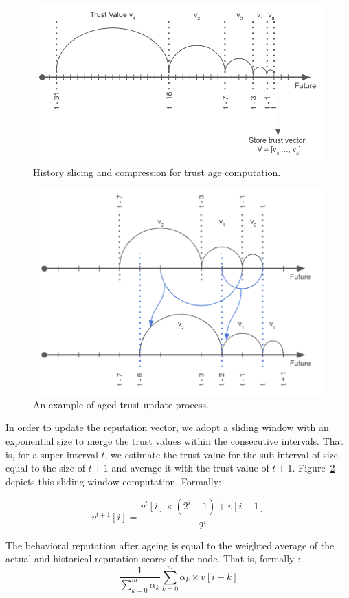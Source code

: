 \documentclass[]{article}
\begin{document}
\begin{figure}[h]
\centering
	\includegraphics[width=0.65\linewidth, trim= 0cm 0cm 0cm 0cm, clip]{Figures/ageB.png}
	\caption{History slicing and compression for trust age computation.}
	\label{fig:historyComp}
\end{figure}

\begin{figure}[h]
\centering
	\includegraphics[width=0.65\linewidth, trim= 0cm 0cm 0cm 0cm, clip]{Figures/ageB1.png}
	\caption{An example of aged trust update process.}
	\label{fig:historyCompUp}
	
\end{figure}

In order to update the reputation vector, we adopt a sliding window with an exponential size to merge the trust values within the consecutive intervals. That is, for a super-interval $t$, we estimate the trust value for the sub-interval of size equal to the size of $t+1$ and average it with the trust value of $t+1$. Figure~\ref{fig:historyCompUp} depicts this sliding window computation. Formally:

\begin{equation}
    v^{t+1}[i] = \frac{v^{t}[i] \times (2^i - 1) + v[i - 1]}{2^i}
\end{equation}

The behavioral reputation after ageing is equal to the weighted average of the actual and historical reputation scores of the node. That is, formally : 
\begin{equation}
    \frac{1}{\sum_{k=0}^{m}\alpha_k}\sum_{k=0}^{m}\alpha_k \times v[i - k]
\end{equation}
\end{document}
